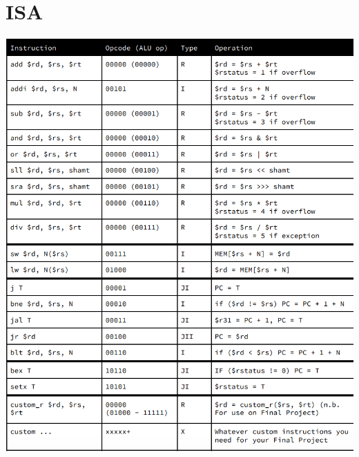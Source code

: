 \documentclass{article}
\begin{document}
\section{ISA}
\includegraphics[width=\textwidth]{image/ISA.png}
\end{document}

